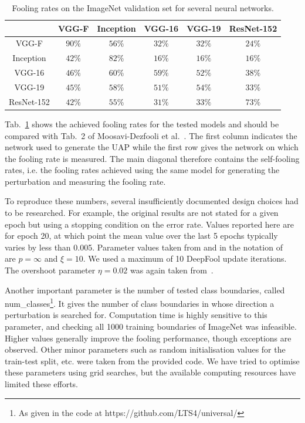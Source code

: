 \documentclass[runningheads]{llncs}
\begin{document}
\begin{table}[htbp]
\centering
\caption{Fooling rates on the ImageNet validation set for several neural networks.}
\begin{tabular}{|c|c|c|c|c|c|}
\hline

			& VGG-F		&	Inception	&	VGG-16		&	VGG-19		&	ResNet-152	\\ \hline
VGG-F		& $90\%$	&	$56\%$		&	$32\%$		&	$32\%$		& 	$24\%$		\\
Inception	& $42\%$	&	$82\%$		&	$16\%$		&	$16\%$		& 	$16\%$	\\
VGG-16		& $46\%$	&	$60\%$		&	$59\%$		&	$52\%$		& 	$38\%$	\\
VGG-19		& $45\%$	&	$58\%$		&	$51\%$		&	$54\%$		& 	$33\%$	\\
ResNet-152	& $42\%$	&	$55\%$		&	$31\%$		&	$33\%$		& 	$73\%$	\\
\hline 
\end{tabular}
\label{tbl_stoerraten_reprod_kreuz_linf}
\end{table}

Tab.~\ref{tbl_stoerraten_reprod_kreuz_linf} shows the achieved fooling rates for the tested models and should be compared with Tab.~2 of Moosavi-Dezfooli et al.~\cite{moosavidezfooli_universal_2017}. The first column indicates the network used to generate the UAP while the first row gives the network on which the fooling rate is measured. The main diagonal therefore contains the self-fooling rates, i.e. the fooling rates achieved using the same model for generating the perturbation and measuring the fooling rate. 

To reproduce these numbers, several insufficiently documented design choices had to be researched. For example, the original results are not stated for a given epoch but using a stopping condition on the error rate. Values reported here are for epoch 20, at which point the mean value over the last 5 epochs typically varies by less than 0.005. Parameter values taken from and in the notation of~\cite{moosavi-dezfooli_deepfool_2016} are \(p=\infty\) and \(\xi=10\). We used a maximum of 10 DeepFool update iterations. The overshoot parameter \(\eta=0.02\) was again taken from~\cite{moosavi-dezfooli_deepfool_2016}. 

Another important parameter is the number of tested class boundaries, called num\_classes\footnote{As given in the code at https://github.com/LTS4/universal/}. It gives the number of class boundaries in whose direction a perturbation is searched for. Computation time is highly sensitive to this parameter, and checking all 1000 training boundaries of ImageNet was infeasible. Higher values generally improve the fooling performance, though exceptions are observed. 
Other minor parameters such as random initialisation values for the train-test split, etc. were taken from the provided code. We have tried to optimise these parameters using grid searches, but the available computing resources have limited these efforts. 
\end{document}
